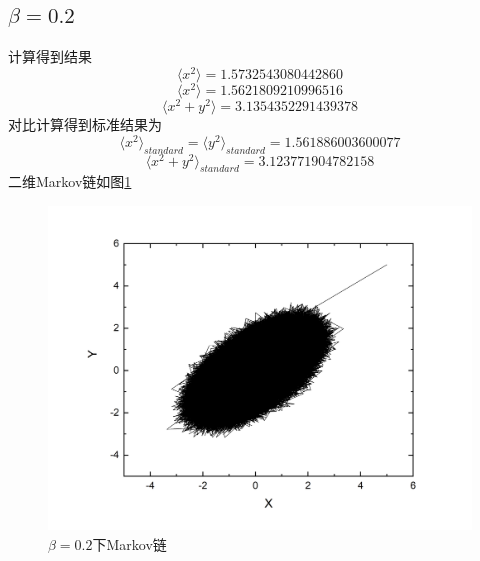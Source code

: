 \documentclass{article}
\begin{document}
	\subsection{$\beta=0.2$}
	计算得到结果
	\begin{equation}
		\langle x^2\rangle=1.5732543080442860
	\end{equation}
\begin{equation}
	\langle x^2\rangle=1.5621809210996516
\end{equation}
\begin{equation}
	\langle x^2+y^2\rangle=3.1354352291439378
\end{equation}
对比计算得到标准结果为
	\begin{equation}
	\langle x^2\rangle_{standard}=\langle y^2\rangle_{standard}=1.561886003600077
\end{equation}
\begin{equation}
	\langle x^2+ y^2\rangle_{standard}=3.123771904782158
\end{equation}
二维Markov链如图\ref{fig:1}
	\begin{figure}[!h]
	
	\centering
	\includegraphics[scale=0.6]{beta02}
	\caption{\heiti{}$ \beta=0.2 $下Markov链}
	\label{fig:1}
\end{figure}
\end{document}
